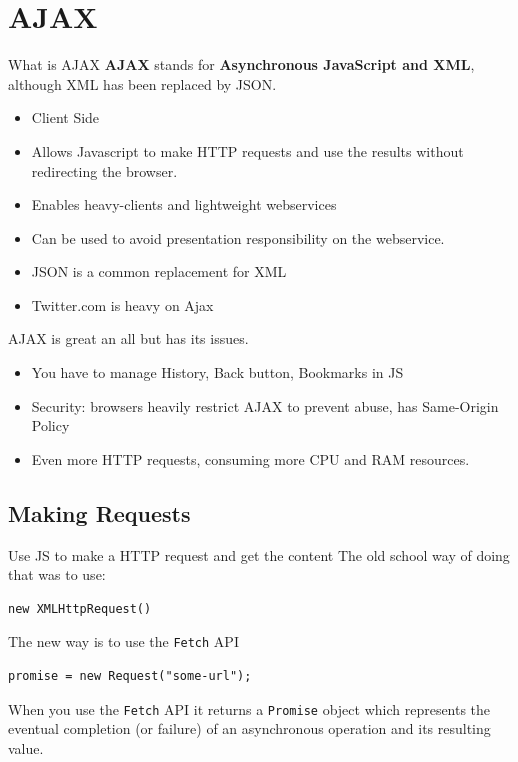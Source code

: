 \documentclass[../CMPUT-404-Notes.tex]{subfiles}
\begin{document}
\chapter{AJAX}

\begin{DndSidebar}[color=PhbLightGreen]{What is AJAX}
    \textbf{AJAX} stands for \textbf{Asynchronous JavaScript and XML}, although XML has been replaced by JSON.

    \begin{itemize}
        \item Client Side
        \item Allows Javascript to make HTTP requests and use the results without redirecting the browser.
        \item Enables heavy-clients and lightweight webservices
        \item Can be used to avoid presentation responsibility on the webservice.
        \item JSON is a common replacement for XML
        \item Twitter.com is heavy on Ajax
    \end{itemize}
\end{DndSidebar}

AJAX is great an all but has its issues.
\begin{itemize}
    \item You have to manage History, Back button, Bookmarks in JS
    \item Security: browsers heavily restrict AJAX to prevent abuse, has Same-Origin Policy
    \item Even more HTTP requests, consuming more CPU and RAM resources.
\end{itemize}

\section{Making Requests}
Use JS to make a HTTP request and get the content
The old school way of doing that was to use:
\begin{verbatim}
new XMLHttpRequest()
\end{verbatim}
The new way is to use the \texttt{Fetch} API
\begin{verbatim}
promise = new Request("some-url");
\end{verbatim}

When you use the \texttt{Fetch} API it returns a \texttt{Promise} object which represents the eventual completion (or failure) of an asynchronous operation and its resulting value.
\end{document}

